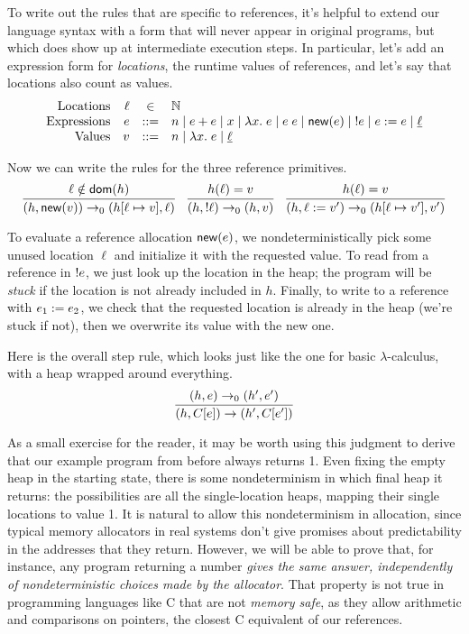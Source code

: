 \documentclass{amsbook}
\theoremstyle{definition}
\theoremstyle{remark}
\numberwithin{section}{chapter}
\numberwithin{equation}{chapter}
\begin{document}
To write out the rules that are specific to references, it's helpful to extend our language syntax with a form that will never appear in original programs, but which does show up at intermediate execution steps.
In particular, let's add an expression form for \emph{locations}, the runtime values of references, and let's say that locations also count as values.
$$\begin{array}{rrcl}
  \textrm{Locations} & \ell &\in& \mathbb N \\
  \textrm{Expressions} & e &::=& n \mid e + e \mid x \mid \lambda x. \; e \mid e \; e \mid \mathsf{new}(e) \mid \; !e \mid e := e \mid \underline{\ell} \\
  \textrm{Values} & v &::=& n \mid \lambda x. \; e \mid \underline{\ell}
\end{array}$$

\newcommand{\dom}[1]{\mathsf{dom}(#1)}
Now we can write the rules for the three reference primitives.
$$\infer{\smallstepo{(h, \newref{v})}{(\mupd{h}{\ell}{v}, \ell)}}{
  \ell \notin \dom{h}
}
\quad \infer{\smallstepo{(h, \readref{\ell})}{(h, v)}}{
  \msel{h}{\ell} = v
}
\quad \infer{\smallstepo{(h, \writeref{\ell}{v'})}{(\mupd{h}{\ell}{v'}, v')}}{
  \msel{h}{\ell} = v
}$$

To evaluate a reference allocation $\mathsf{new}(e)$, we nondeterministically pick some unused location $\ell$ and initialize it with the requested value.
To read from a reference in $!e$, we just look up the location in the heap; the program will be \emph{stuck} if the location is not already included in $h$.
Finally, to write to a reference with $e_1 := e_2$, we check that the requested location is already in the heap (we're stuck if not), then we overwrite its value with the new one.

Here is the overall step rule, which looks just like the one for basic $\lambda$-calculus, with a heap wrapped around everything.
$$\infer{\smallstep{(h, \plug{C}{e})}{(h', \plug{C}{e'})}}{
  \smallstepo{(h, e)}{(h', e')}
}$$

As a small exercise for the reader, it may be worth using this judgment to derive that our example program from before always returns 1.
Even fixing the empty heap in the starting state, there is some nondeterminism in which final heap it returns: the possibilities are all the single-location heaps, mapping their single locations to value 1.
It is natural to allow this nondeterminism in allocation, since typical memory allocators in real systems don't give promises about predictability in the addresses that they return.
However, we will be able to prove that, for instance, any program returning a number \emph{gives the same answer, independently of nondeterministic choices made by the allocator}.
That property is not true in programming languages like C that are not \emph{memory safe}, as they allow arithmetic and comparisons on pointers, the closest C equivalent of our references.
\end{document}
